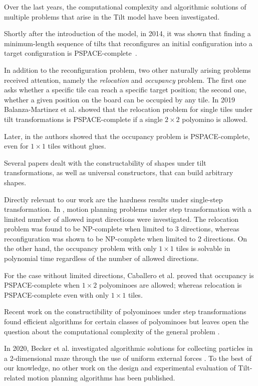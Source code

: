 Over the last years, the computational complexity and algorithmic solutions of multiple problems that arise in the Tilt model have been investigated. \par
Shortly after the introduction of the model, in 2014, it was shown that finding a minimum-length sequence of tilts that reconfigures an initial configuration into a target configuration is PSPACE-complete~\cite{Becker2014}. \par
In addition to the reconfiguration problem, two other naturally arising problems received attention, namely the \emph{relocation} and \emph{occupancy} problem. The first one asks whether a specific tile can reach a specific target position; the second one, whether a given position on the board can be occupied by any tile.
In 2019 Balanza-Martinez et al. \cite{Balanza-Martinez2019} showed that the relocation problem for single tiles under tilt transformations is PSPACE-complete if a single $2 \times 2$ polyomino is allowed. \par
Later, in \cite{BalanzaMartinez2020} the authors showed that the occupancy problem is PSPACE-complete, even for $1 \times 1$ tiles without glues. \par
Several papers \cite{Becker2017, Schmidt2018, Balanza-Martinez2019, BalanzaMartinez2020} dealt with the constructability of shapes under tilt transformations, as well as universal constructors, that can build arbitrary shapes. \par
Directly relevant to our work are the hardness results under single-step transformation.
In \cite{Balanza-Martinez2019a, Caballero2020b}, motion planning problems under step transformation with a limited number of allowed input directions were investigated. The relocation problem was found to be NP-complete when limited to 3 directions, whereas reconfiguration was shown to be NP-complete when limited to 2 directions. On the other hand, the occupancy problem with only $1 \times 1$ tiles is solvable in polynomial time regardless of the number of allowed directions. \par
For the case without limited directions, Caballero et al. \cite{Caballero2020a} proved that occupancy is PSPACE-complete when $1 \times 2$ polyominoes are allowed; whereas relocation is PSPACE-complete even with only $1 \times 1$ tiles. \par
Recent work on the constructibility of polyominoes under step transformations found efficient algorithms for certain classes of polyominoes but leaves open the question about the computational complexity of the general problem \cite{Keller2021}. \par
In 2020, Becker et al. investigated algorithmic solutions for collecting particles in a 2-dimensional maze through the use of uniform external forces \cite{Becker2020a}.
To the best of our knowledge, no other work on the design and experimental evaluation of Tilt-related motion planning algorithms has been published.

